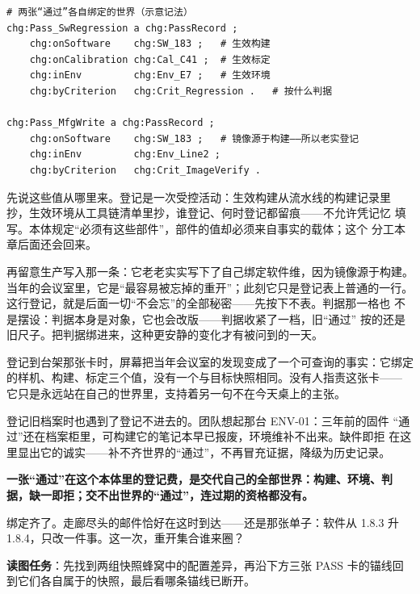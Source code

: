 \nopagebreak[4]
\begin{codebox}
\begin{Verbatim}[fontsize=\small,breaklines=true,breakanywhere=true,breaksymbolleft={},breaksymbolright={}]
# 两张“通过”各自绑定的世界（示意记法）
chg:Pass_SwRegression a chg:PassRecord ;
    chg:onSoftware    chg:SW_183 ;   # 生效构建
    chg:onCalibration chg:Cal_C41 ;  # 生效标定
    chg:inEnv         chg:Env_E7 ;   # 生效环境
    chg:byCriterion   chg:Crit_Regression .   # 按什么判据

chg:Pass_MfgWrite a chg:PassRecord ;
    chg:onSoftware    chg:SW_183 ;   # 镜像源于构建——所以老实登记
    chg:inEnv         chg:Env_Line2 ;
    chg:byCriterion   chg:Crit_ImageVerify .
\end{Verbatim}
\end{codebox}

先说这些值从哪里来。登记是一次受控活动：生效构建从流水线的构建记录里
抄，生效环境从工具链清单里抄，谁登记、何时登记都留痕——不允许凭记忆
填写。本体规定“必须有这些部件”，部件的值却必须来自事实的载体；这个
分工本章后面还会回来。

再留意生产写入那一条：它老老实实写下了自己绑定软件维，因为镜像源于构建。
当年的会议室里，它是“最容易被忘掉的重开”；此刻它只是登记表上普通的一行。
这行登记，就是后面一切“不会忘”的全部秘密——先按下不表。判据那一格也
不是摆设：判据本身是对象，它也会改版——判据收紧了一档，旧“通过”
按的还是旧尺子。把判据绑进来，这种更安静的变化才有被问到的一天。

登记到台架那张卡时，屏幕把当年会议室的发现变成了一个可查询的事实：它绑定
的样机、构建、标定三个值，没有一个与目标快照相同。没有人指责这张卡——
它只是永远站在自己的世界里，支持着另一句不在今天桌上的主张。

登记旧档案时也遇到了登记不进去的。团队想起那台 ENV-01：三年前的固件
“通过”还在档案柜里，可构建它的笔记本早已报废，环境维补不出来。缺件即拒
在这里显出它的诚实——补不齐世界的“通过”，不再冒充证据，降级为历史记录。

\textbf{一张“通过”在这个本体里的登记费，是交代自己的全部世界：构建、环境、判据，缺一即拒；交不出世界的“通过”，连过期的资格都没有。}

绑定齐了。走廊尽头的邮件恰好在这时到达——还是那张单子：软件从 1.8.3 升
1.8.4，只改一件事。这一次，重开集合谁来圈？


\begin{noteblock}
\textbf{读图任务}：先找到两组快照蜂窝中的配置差异，再沿下方三张 PASS 卡的锚线回到它们各自属于的快照，最后看哪条锚线已断开。
\end{noteblock}

